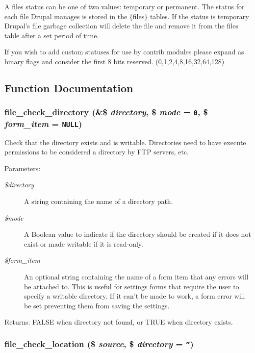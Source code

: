 A files status can be one of two values: temporary or permanent. The status for each file Drupal manages is stored in the \{files\} tables. If the status is temporary Drupal's file garbage collection will delete the file and remove it from the files table after a set period of time.

If you wish to add custom statuses for use by contrib modules please expand as binary flags and consider the first 8 bits reserved. (0,1,2,4,8,16,32,64,128) 

\subsection{Function Documentation}
\hypertarget{group__file_g1cae9f6fea37182a71710f0209d586dd}{
\subsubsection[{file\_\-check\_\-directory}]{\setlength{\rightskip}{0pt plus 5cm}file\_\-check\_\-directory (\&\$ {\em directory}, \/  \$ {\em mode} = {\tt 0}, \/  \$ {\em form\_\-item} = {\tt NULL})}}
\label{group__file_g1cae9f6fea37182a71710f0209d586dd}


Check that the directory exists and is writable. Directories need to have execute permissions to be considered a directory by FTP servers, etc.

\begin{Desc}
\item[Parameters:]
\begin{description}
\item[{\em \$directory}]A string containing the name of a directory path. \item[{\em \$mode}]A Boolean value to indicate if the directory should be created if it does not exist or made writable if it is read-only. \item[{\em \$form\_\-item}]An optional string containing the name of a form item that any errors will be attached to. This is useful for settings forms that require the user to specify a writable directory. If it can't be made to work, a form error will be set preventing them from saving the settings. \end{description}
\end{Desc}
\begin{Desc}
\item[Returns:]FALSE when directory not found, or TRUE when directory exists. \end{Desc}
\hypertarget{group__file_g1cdeffc5a199d73e83e1e1d27753f619}{
\subsubsection[{file\_\-check\_\-location}]{\setlength{\rightskip}{0pt plus 5cm}file\_\-check\_\-location (\$ {\em source}, \/  \$ {\em directory} = {\tt ''})}}
\label{group__file_g1cdeffc5a199d73e83e1e1d27753f619}


